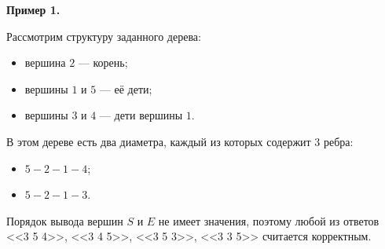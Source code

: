 \textbf{Пример 1.}

Рассмотрим структуру заданного дерева:

\begin{itemize}

\item вершина $2$ --- корень;

\item вершины $1$ и $5$ --- её дети;

\item вершины $3$ и $4$ --- дети вершины $1$.

\end{itemize}

В этом дереве есть два диаметра, каждый из которых содержит $3$ ребра:

\begin{itemize}

\item $5 - 2 - 1 - 4$;

\item $5 - 2 - 1 - 3$.

\end{itemize}

Порядок вывода вершин $S$ и $E$ не имеет значения, поэтому любой из ответов <<3 5 4>>, <<3 4 5>>, <<3 5 3>>, <<3 3 5>> считается корректным.
